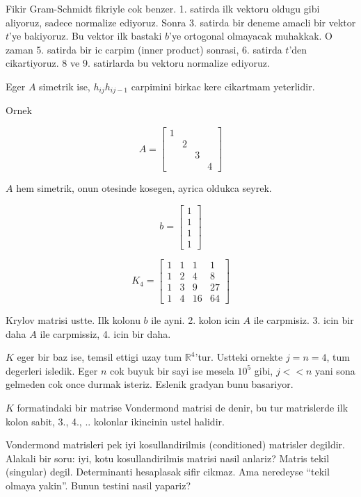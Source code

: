 \documentclass[12pt,fleqn]{article}\usepackage{../common}
\begin{document}
Fikir Gram-Schmidt fikriyle cok benzer. 1. satirda ilk vektoru oldugu gibi
aliyoruz, sadece normalize ediyoruz. Sonra 3. satirda bir deneme
amacli bir vektor $t$'ye  bakiyoruz. Bu vektor ilk bastaki $b$'ye ortogonal
olmayacak muhakkak. O zaman 5. satirda bir ic carpim (inner product)
sonrasi, 6. satirda $t$'den cikartiyoruz. 8 ve 9. satirlarda bu
vektoru normalize ediyoruz. 

Eger $A$ simetrik ise, $h_{ij}h_{ij-1}$ carpimini birkac kere cikartmam
yeterlidir. 

Ornek 

\[  
A = 
\left[\begin{array}{rrrr}
1 &&& \\
 & 2 && \\
 && 3 & \\
 &&& 4 
\end{array}\right]
\]

$A$ hem simetrik, onun otesinde kosegen, ayrica oldukca seyrek. 

\[  
b = 
\left[\begin{array}{r}
1 \\ 1\\ 1 \\ 1
\end{array}\right]
\]


\[  
K_4 = 
\left[\begin{array}{rrrr}
1 & 1 & 1 & 1\\
1 & 2 & 4 & 8\\
1 & 3 & 9 & 27\\
1 & 4 & 16 & 64 
\end{array}\right]
\]

Krylov matrisi ustte. Ilk kolonu $b$ ile ayni. 2. kolon icin $A$ ile
carpmisiz. 3. icin bir daha $A$ ile carpmissiz, 4. icin bir daha. 

$K$ eger bir baz ise, temsil ettigi uzay tum $\mathbb{R}^4$'tur. Ustteki
ornekte $j = n = 4$, tum degerleri isledik. Eger $n$ cok buyuk bir sayi ise
mesela $10^5$ gibi, $j << n$ yani sona gelmeden cok once durmak
isteriz. Eslenik gradyan bunu basariyor. 

$K$ formatindaki bir matrise Vondermond matrisi de denir, bu tur
matrislerde ilk kolon sabit, 3., 4., .. kolonlar ikincinin ustel 
halidir. 

Vondermond matrisleri pek iyi kosullandirilmis (conditioned) matrisler
degildir. Alakali bir soru: iyi, kotu kosullandirilmis matrisi nasil
anlariz? Matris tekil (singular) degil. Determinanti hesaplasak sifir
cikmaz. Ama neredeyse ``tekil olmaya yakin''. Bunun testini nasil yapariz? 
\end{document}

